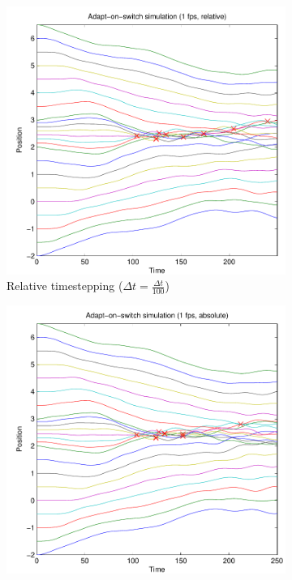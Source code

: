 \documentclass[11pt]{article}
\begin{document}
\begin{figure}[H]
    \begin{subfigure}[t]{0.5\textwidth}
        \includegraphics[width=\textwidth]{../images/switch_multiscale_1fps_relative.pdf}
        \caption{Relative timestepping ($\Delta t = \frac{\Delta t}{100}$)}
        \label{fig:switch_multi_1fps_relative}
    \end{subfigure}
    \begin{subfigure}[t]{0.5\textwidth}
        \includegraphics[width=\textwidth]{../images/switch_multiscale_1fps_absolute.pdf}

\end{subfigure}
\end{figure}
\end{document}

